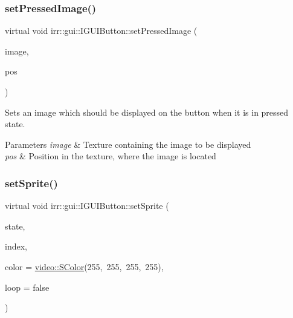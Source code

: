 \subsubsection{\texorpdfstring{set\+Pressed\+Image()}{setPressedImage()}\hspace{0.1cm}{\footnotesize\ttfamily [2/2]}}
{\footnotesize\ttfamily virtual void irr\+::gui\+::\+I\+G\+U\+I\+Button\+::set\+Pressed\+Image (\begin{DoxyParamCaption}\item[{\hyperlink{classirr_1_1video_1_1ITexture}{video\+::\+I\+Texture} $\ast$}]{image,  }\item[{const \hyperlink{classirr_1_1core_1_1rect}{core\+::rect}$<$ \hyperlink{namespaceirr_ac66849b7a6ed16e30ebede579f9b47c6}{s32} $>$ \&}]{pos }\end{DoxyParamCaption})\hspace{0.3cm}{\ttfamily [pure virtual]}}



Sets an image which should be displayed on the button when it is in pressed state. 


\begin{DoxyParams}{Parameters}
{\em image} & Texture containing the image to be displayed \\
\hline
{\em pos} & Position in the texture, where the image is located \\
\hline
\end{DoxyParams}
\mbox{\label{classirr_1_1gui_1_1IGUIButton_a26c5f05e922b0fc1b5790a001fd04b78}} 
\subsubsection{\texorpdfstring{set\+Sprite()}{setSprite()}}
{\footnotesize\ttfamily virtual void irr\+::gui\+::\+I\+G\+U\+I\+Button\+::set\+Sprite (\begin{DoxyParamCaption}\item[{\hyperlink{namespaceirr_1_1gui_a2520445dec46e00684645ef8053aebb5}{E\+G\+U\+I\+\_\+\+B\+U\+T\+T\+O\+N\+\_\+\+S\+T\+A\+TE}}]{state,  }\item[{\hyperlink{namespaceirr_ac66849b7a6ed16e30ebede579f9b47c6}{s32}}]{index,  }\item[{\hyperlink{classirr_1_1video_1_1SColor}{video\+::\+S\+Color}}]{color = {\ttfamily \hyperlink{classirr_1_1video_1_1SColor}{video\+::\+S\+Color}(255,~255,~255,~255)},  }\item[{bool}]{loop = {\ttfamily false} }\end{DoxyParamCaption})\hspace{0.3cm}{\ttfamily [pure virtual]}}



